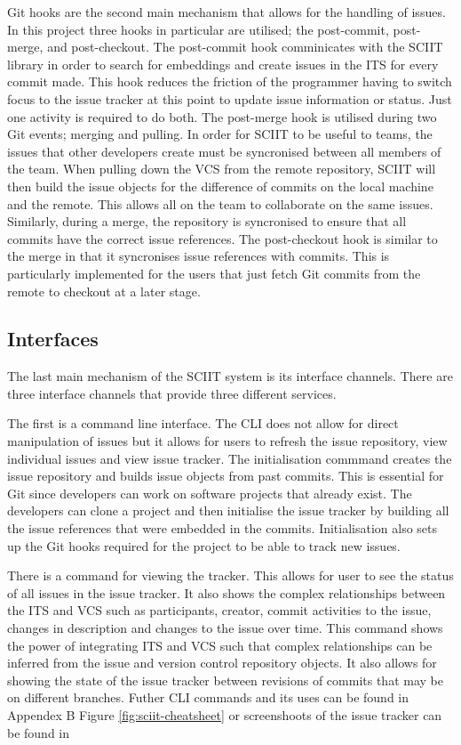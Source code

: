 \documentclass{mproj}
\begin{document}
Git hooks are the second main mechanism that allows for the handling of issues. In this project three hooks in particular are utilised; the post-commit, post-merge, and post-checkout. The post-commit hook comminicates with the SCIIT library in order to search for embeddings and create issues in the ITS for every commit made. This hook reduces the friction of the programmer having to switch focus to the issue tracker at this point to update issue information or status. Just one activity is required to do both. The post-merge hook is utilised during two Git events; merging and pulling. In order for SCIIT to be useful to teams, the issues that other developers create must be syncronised between all members of the team. When pulling down the VCS from the remote repository, SCIIT will then build the issue objects for the difference of commits on the local machine and the remote. This allows all on the team to collaborate on the same issues. Similarly, during a merge, the repository is syncronised to ensure that all commits have the correct issue references. The post-checkout hook is similar to the merge in that it syncronises issue references with commits. This is particularly implemented for the users that just fetch Git commits from the remote to checkout at a later stage.

\subsection{Interfaces}

The last main mechanism of the SCIIT system is its interface channels. There are three interface channels that provide three different services. 

The first is a command line interface. The CLI does not allow for direct manipulation of issues but it allows for users to refresh the issue repository, view individual issues and view issue tracker. The initialisation commmand creates the issue repository and builds issue objects from past commits. This is essential for Git since developers can work on software projects that already exist. The developers can clone a project and then initialise the issue tracker by building all the issue references that were embedded in the commits. Initialisation also sets up the Git hooks required for the project to be able to track new issues. 

There is a command for viewing the tracker. This allows for user to see the status of all issues in the issue tracker. It also shows the complex relationships between the ITS and VCS such as participants, creator, commit activities to the issue, changes in description and changes to the issue over time. This command shows the power of integrating ITS and VCS such that complex relationships can be inferred from the issue and version control repository objects. It also allows for showing the state of the issue tracker between revisions of commits that may be on different branches. Futher CLI commands and its uses can be found in Appendex B Figure \ref{fig:sciit-cheatsheet} or screenshoots of the issue tracker can be found in %
\end{document}
